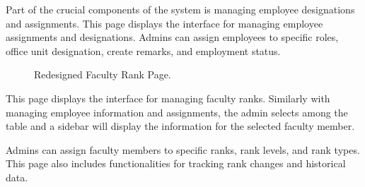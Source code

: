     Part of the crucial components of the system is managing employee designations and assignments. This page displays the interface for managing employee assignments and designations. Admins can assign employees to specific roles, office unit designation, create remarks, and employment status.

    \begin{figure}[H]
        \centering
        \caption{Redesigned Faculty Rank Page.}
        \label{fig:app-fac-rank}
    \end{figure}

    This page displays the interface for managing faculty ranks. Similarly with managing employee information and assignments, the admin selects among the table and a sidebar will display the information for the selected faculty member.
    
    Admins can assign faculty members to specific ranks, rank levels, and rank types. This page also includes functionalities for tracking rank changes and historical data.

